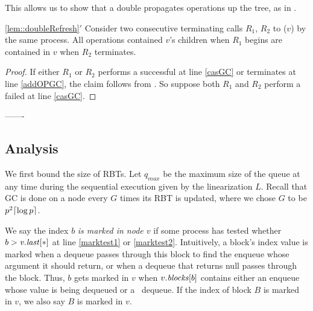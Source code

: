 This allows us to show that a double  propagates operations up the tree, 
as in .

\begin{customlemma}{\ref{lem::doubleRefresh}$'$}\label{lem::doubleRefreshGC}
Consider two consecutive terminating calls $R_1$, $R_2$ to ($v$) by the same process.
All operations contained $v$'s children when $R_1$ begins
are contained in $v$ when $R_2$ terminates.
\end{customlemma}
\begin{proof}
If either $R_1$ or $R_2$ performs a successful  at line \ref{casGC} or terminates at line \ref{addOPGC}, the claim follows
from .
So suppose both $R_1$ and $R_2$ perform a failed  at line \ref{casGC}.

\end{proof}





-------

\subsection{Analysis}
\label{sec::GCanalysis}


We first bound the size of RBTs.  Let $q_{max}$ be the maximum size of the queue at any time during the sequential execution given by the linearization $L$.
Recall that GC is done on a node every $G$ times its RBT is updated, where we chose $G$ to be $p^2\lceil \log p \rceil$.

We say the index $b$ \emph{is marked in node $v$} if some process has tested
whether $b>\mbox{\textnormal{\textit{v}}}.\mbox{\textit{last}}[*]$ at line \ref{marktest1} or \ref{marktest2}.
Intuitively, a block's index value is marked 
when a dequeue passes through this block to find the enqueue
whose argument it should return, or when a dequeue that returns null passes through the block.
Thus, $b$ gets marked in $v$ when $v.\mbox{\textit{blocks}}[b]$ 
contains either an enqueue whose value is being dequeued or a \nl\ dequeue.
If the index of block $B$ is marked in $v$, we also say $B$ is marked in $v$.

